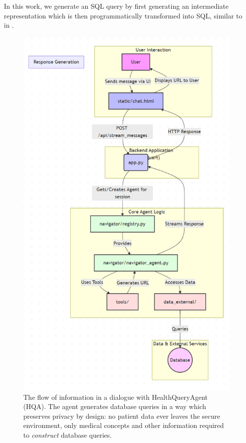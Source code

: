\documentclass[11pt]{article}
\begin{document}
In this work, we generate an SQL query by first generating an intermediate representation which is then programmatically transformed into SQL, similar to in \cite{guo_towards_2019}.


\begin{figure}[t]
  \includegraphics[width=0.9\columnwidth]{content/flow_diagram.PNG}
	\caption{The flow of information in a dialogue with HealthQueryAgent (HQA). The agent generates database queries in a way which preserves privacy by design: no patient data ever leaves the secure environment, only medical concepts and other information required to \textit{construct} database queries.} 
  \label{fig:flow-diagram}
\end{figure}
\end{document}
